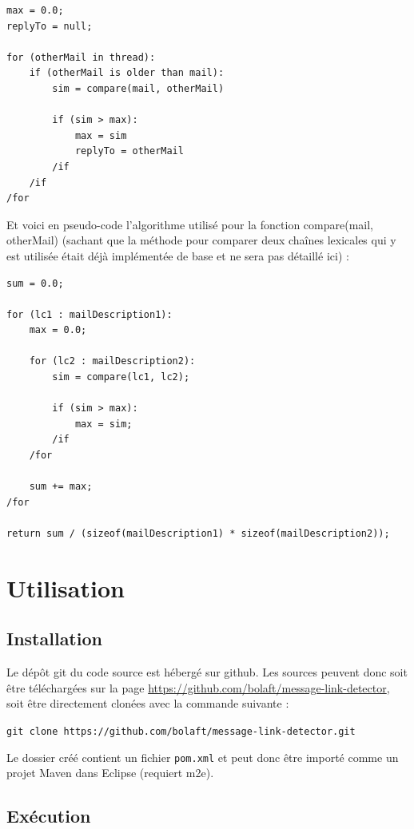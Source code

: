 \documentclass[a4paper]{article}
\begin{document}
\begin{lstlisting}
max = 0.0;
replyTo = null;

for (otherMail in thread):
	if (otherMail is older than mail):
		sim = compare(mail, otherMail)
		
		if (sim > max):
			max = sim
			replyTo = otherMail
		/if
	/if
/for
\end{lstlisting}

Et voici en pseudo-code l'algorithme utilisé pour la fonction compare(mail, otherMail) (sachant que la méthode pour comparer deux chaînes lexicales qui y est utilisée était déjà implémentée de base et ne sera pas détaillé ici) :

\begin{lstlisting}
sum = 0.0;

for (lc1 : mailDescription1):
	max = 0.0;
	
	for (lc2 : mailDescription2):
		sim = compare(lc1, lc2);
		
		if (sim > max):
			max = sim;
		/if
	/for
	
	sum += max;
/for

return sum / (sizeof(mailDescription1) * sizeof(mailDescription2));
\end{lstlisting}

\section{Utilisation}

\subsection{Installation}

Le dépôt git du code source est hébergé sur github. Les sources peuvent donc soit être téléchargées sur la page \url{https://github.com/bolaft/message-link-detector}, soit être directement clonées avec la commande suivante :\newline

\texttt{git clone https://github.com/bolaft/message-link-detector.git}\newline

Le dossier créé contient un fichier \texttt{pom.xml} et peut donc être importé comme un projet Maven dans Eclipse (requiert m2e).

\subsection{Exécution}
\end{document}

